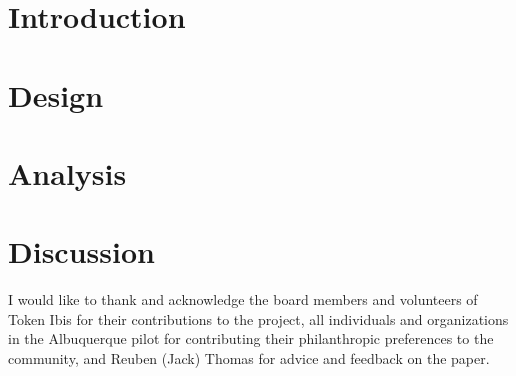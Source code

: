 \documentclass[sigconf]{acmart}
\begin{document}



\maketitle

\section{Introduction}


\section{Design}


\section{Analysis}


\section{Discussion}


\begin{acks}
  I would like to thank and acknowledge the board members and volunteers of Token Ibis for their contributions to the project, all individuals and organizations in the Albuquerque pilot for contributing their philanthropic preferences to the community, and Reuben (Jack) Thomas for advice and feedback on the paper.
\end{acks}



\end{document}
